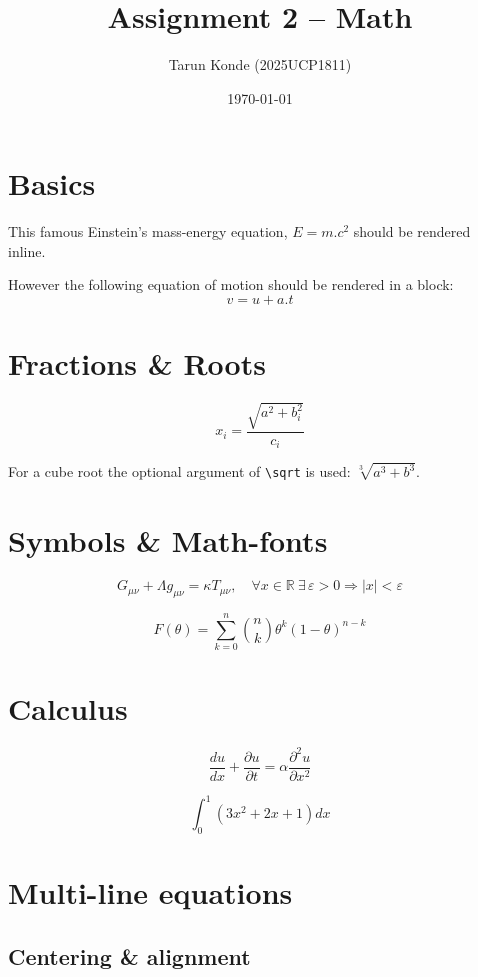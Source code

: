 \documentclass[11pt,a4paper]{article}
\title{Assignment 2 -- Math}
\author{Tarun Konde (2025UCP1811)}
\date{\today}
\begin{document}
\maketitle

\section{Basics}

This famous Einstein's mass-energy equation, $E = m.c^2$ should be rendered
inline.

However the following equation of motion should be rendered in a block:
\[
    v = u + a.t
\]

\section{Fractions \& Roots}

\[
    x_i = \frac{\sqrt{a^2 + b_i^2}}{c_i}
\]

For a cube root the optional argument of \verb|\sqrt| is used:
$\sqrt[3]{a^3 + b^3}$.

\section{Symbols \& Math-fonts}

\[
    G_{\mu\nu} + \Lambda g_{\mu\nu} = \kappa T_{\mu\nu},
    \quad
    \forall x \in \mathbb{R}\ \exists\, \varepsilon > 0 \Rightarrow |x| < \varepsilon
\]

\[
    F(\theta) = \sum_{k=0}^{n} \binom{n}{k} \theta^{k} (1-\theta)^{n-k}
\]

\section{Calculus}

\[
    \frac{du}{dx} + \frac{\partial u}{\partial t}
        = \alpha \frac{\partial^2 u}{\partial x^2}
\]

\[
    \int_{0}^{1} \left(3x^2 + 2x + 1\right) dx
\]

\section{Multi-line equations}

\subsection{Centering \& alignment}
\end{document}
